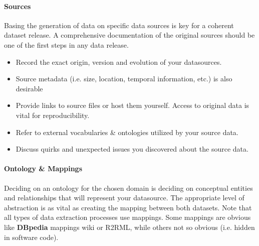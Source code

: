 \documentclass[a4paper,english,twoside,BCOR1.5cm,headsepline,DIV12,appendixprefix,final,12pt]{scrbook}
\newcommand{\dbpedia}{{\ttfamily\bfseries DBpedia}\xspace}
\begin{document}
\paragraph{Sources}
Basing the generation of data on specific data sources is key for a coherent dataset release. 
A comprehensive documentation of the original sources should be one of the first steps in any data release.
\begin{itemize}
\itemsep0em 
\item Record the exact origin, version and evolution of your datasources. 
\item Source metadata (i.e. size, location, temporal information, etc.) is also desirable%
\item Provide links to source files or host them yourself. Access to original data is vital for reproducibility.
\item Refer to external vocabularies \& ontologies utilized by your source data.%
\item Discuss quirks and unexpected issues you discovered about the source data.
\end{itemize}

\vspace{-1.5em}
\paragraph{Ontology \& Mappings}
\label{sec:less.onto}
Deciding on an ontology for the chosen domain is deciding on conceptual entities and relationships that will represent your datasource. The appropriate level of abstraction is as vital as creating the mapping between both datasets. Note that all types of data extraction processes use mappings. Some mappings are obvious like \dbpedia mappings wiki or R2RML, while others not so obvious (i.e. hidden in software code).
\end{document}
